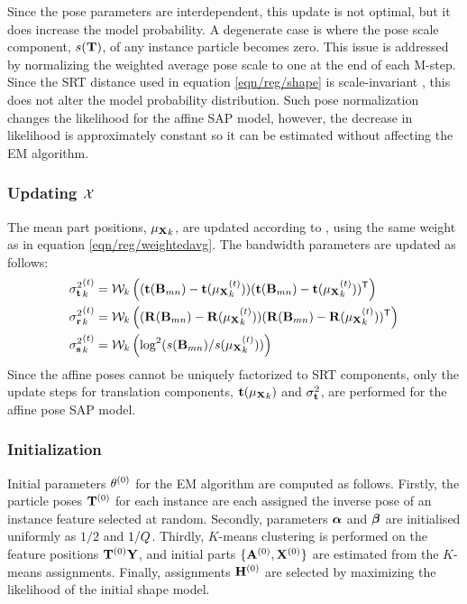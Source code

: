 Since the pose parameters are interdependent, this update is not optimal, but it does increase the model probability.
A degenerate case is where the pose scale component, $s(\mathbf{T})$, of any instance particle becomes zero. This issue is addressed by normalizing the weighted average pose scale to one at the end of each M-step. Since the SRT distance used in equation \ref{eqn/reg/shape} is scale-invariant \cite{Pham2011}, this does not alter the model probability distribution. Such pose normalization changes the likelihood for the affine SAP model, however, the decrease in likelihood is approximately constant so it can be estimated without affecting the EM algorithm.

\subsubsection{Updating $\mathcal{X}$}
The mean part positions, ${\mu_{\mathbf{X}}}_k$, are updated according to \cite{Pham2011}, using the same weight as in equation \ref{eqn/reg/weightedavg}. The bandwidth parameters are updated as follows:
\begin{align}
	{\sigma^{2}_{\mathbf{t}}}_{k}^{(t)} & = \mathcal{W}_k\left((\mathbf{t}(\mathbf{B}_{mn}) - \mathbf{t}({\mu_{\mathbf{X}}}_{k}^{(t)}))(\mathbf{t}(\mathbf{B}_{mn}) - \mathbf{t}({\mu_{\mathbf{X}}}_{k}^{(t)}))^{\textsf{T}}\right) \label{eqn/reg/updatemeant}\\ 
	{\sigma^{2}_{\mathbf{r}}}_{k}^{(t)} & = \mathcal{W}_k\left((\mathbf{R}(\mathbf{B}_{mn}) - \mathbf{R}({\mu_{\mathbf{X}}}_{k}^{(t)}))(\mathbf{R}(\mathbf{B}_{mn}) - \mathbf{R}({\mu_{\mathbf{X}}}_{k}^{(t)}))^{\textsf{T}}\right) \label{eqn/reg/updatedmeanr}\\
	{\sigma^{2}_{\mathbf{s}}}_{k}^{(t)} & = \mathcal{W}_k\left(\log^2(s(\mathbf{B}_{mn})/s({\mu_{\mathbf{X}}}_{k}^{(t)}))\right) \label{eqn/reg/updatemeans}
\end{align}
Since the affine poses cannot be uniquely factorized to SRT components, only the update steps for translation components, \ie $\mathbf{t}({\mu_{\mathbf{X}}}_k)$ and ${\sigma^{2}_{\mathbf{t}}}$, are performed for the affine pose SAP model. 

\subsubsection{Initialization}
Initial parameters $\theta^{(0)}$ for the EM algorithm are computed as follows. Firstly, the particle poses $\mathbf{T}^{(0)}$ for each instance are each assigned the inverse pose of an instance feature selected at random. Secondly, parameters $\bm{\alpha}$ and $\bm{\beta}$ are initialised uniformly as $1/2$ and $1/Q$. Thirdly, $K$-means clustering is performed on the feature positions $\mathbf{T}^{(0)}\mathbf{Y}$, and initial parts $\{\mathbf{A}^{(0)}, \mathbf{X}^{(0)}\}$ are estimated from the $K$-means assignments. Finally, assignments $\mathbf{H}^{(0)}$ are selected by maximizing the likelihood of the initial shape model.

